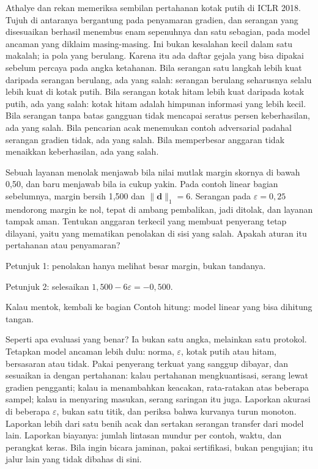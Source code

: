 Athalye dan rekan memeriksa sembilan pertahanan kotak putih di ICLR 2018. Tujuh
di antaranya bergantung pada penyamaran gradien, dan serangan yang disesuaikan
berhasil menembus enam sepenuhnya dan satu sebagian, pada model ancaman yang
diklaim masing-masing. Ini bukan kesalahan kecil dalam satu makalah; ia pola yang
berulang. Karena itu ada daftar gejala yang bisa dipakai sebelum percaya pada angka
ketahanan. Bila serangan satu langkah lebih kuat daripada serangan berulang, ada yang
salah: serangan berulang seharusnya selalu lebih kuat di kotak putih. Bila serangan
kotak hitam lebih kuat daripada kotak putih, ada yang salah: kotak hitam adalah
himpunan informasi yang lebih kecil. Bila serangan tanpa batas gangguan tidak
mencapai seratus persen keberhasilan, ada yang salah. Bila pencarian acak menemukan
contoh adversarial padahal serangan gradien tidak, ada yang salah. Bila memperbesar
anggaran tidak menaikkan keberhasilan, ada yang salah.

\begin{tantangan}
Sebuah layanan menolak menjawab bila nilai mutlak margin skornya di bawah 0,50, dan
baru menjawab bila ia cukup yakin. Pada contoh linear bagian sebelumnya, margin bersih
1,500 dan $\lVert\mathbf{d}\rVert_1=6$. Serangan pada $\varepsilon=0{,}25$ mendorong
margin ke nol, tepat di ambang pembalikan, jadi ditolak, dan layanan tampak aman.
Tentukan anggaran terkecil yang membuat penyerang tetap dilayani, yaitu yang mematikan
penolakan di sisi yang salah. Apakah aturan itu pertahanan atau penyamaran?

Petunjuk 1: penolakan hanya melihat besar margin, bukan tandanya.

Petunjuk 2: selesaikan $1{,}500-6\varepsilon=-0{,}500$.

Kalau mentok, kembali ke bagian Contoh hitung: model linear yang bisa dihitung tangan.
\end{tantangan}

Seperti apa evaluasi yang benar? Ia bukan satu angka, melainkan satu protokol. Tetapkan
model ancaman lebih dulu: norma, $\varepsilon$, kotak putih atau hitam, bersasaran atau
tidak. Pakai penyerang terkuat yang sanggup dibayar, dan sesuaikan ia dengan pertahanan:
kalau pertahanan mengkuantisasi, serang lewat gradien pengganti; kalau ia menambahkan
keacakan, rata-ratakan atas beberapa sampel; kalau ia menyaring masukan, serang
saringan itu juga. Laporkan akurasi di beberapa $\varepsilon$, bukan satu titik, dan
periksa bahwa kurvanya turun monoton. Laporkan lebih dari satu benih acak dan sertakan
serangan transfer dari model lain. Laporkan biayanya: jumlah lintasan mundur per contoh,
waktu, dan perangkat keras. Bila ingin bicara jaminan, pakai sertifikasi, bukan
pengujian; itu jalur lain yang tidak dibahas di sini.

